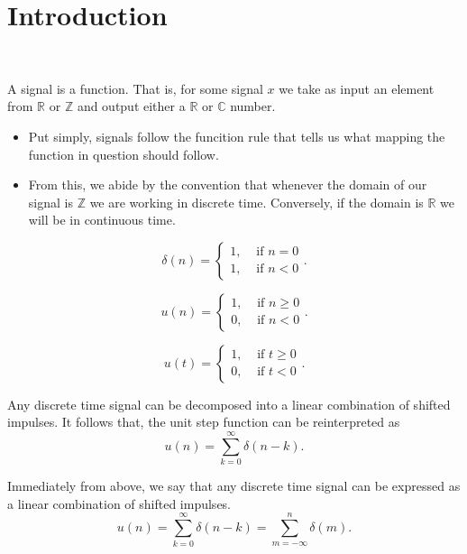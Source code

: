 \section{Introduction}
\begin{definition}[Signal]~

	A signal is a function. That is, for some signal $x$ we take as
	input an element from $\mathbb{R}$ or $\mathbb{Z}$ and output either a
	$\mathbb{R}$ or $\mathbb{C}$ number.
\end{definition}
\begin{itemize}
	\item Put simply, signals follow the funcition rule that tells us what
	      mapping the function in question should follow.
	\item From this, we abide by the convention that whenever the domain
	      of our signal is $\mathbb{Z}$ we are working in discrete time.
	      Conversely, if the domain is $\mathbb{R}$ we will be in
	      continuous time.
\end{itemize}
\begin{definition}
	\[
		\delta(n) = \begin{cases}
			1, & \text{ if }n=0 \\
			1, & \text{ if }n<0
		\end{cases}
		.\]
\end{definition}
\begin{definition}
	\[
		u(n) = \begin{cases}
			1, & \text{ if }n\ge0 \\
			0, & \text{ if }n<0
		\end{cases}
		.\]
\end{definition}
\begin{definition}
	\[
		u(t) = \begin{cases}
			1, & \text{ if }t\ge 0 \\
			0, & \text{ if }t<0
		\end{cases}
		.\]
\end{definition}
\begin{theorem}
	Any discrete time signal can be decomposed into a linear combination of
	shifted impulses. It follows that, the unit step function can be
	reinterpreted as
	\[
		u(n) = \sum_{k=0}^{\infty} \delta(n-k)
		.\]
\end{theorem}
\begin{theorem}
	Immediately from above, we say that any discrete time signal can be
	expressed as a linear combination of shifted impulses.
	\[
		u(n) = \sum_{k=0}^{\infty} \delta(n-k) = \sum_{m=-\infty}^{n} \delta(m)
		.\]
\end{theorem}
